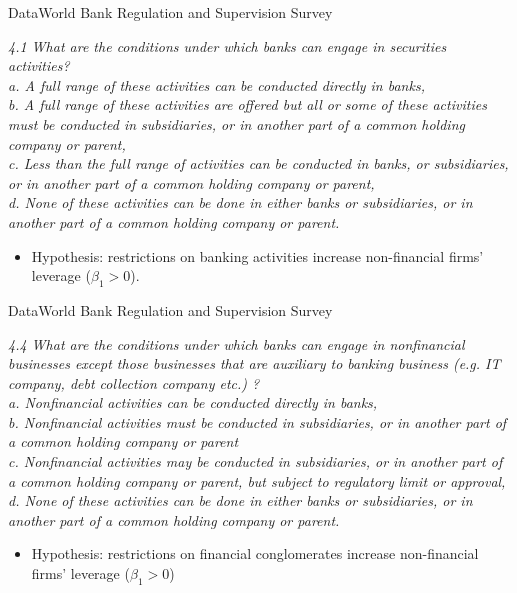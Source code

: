 \documentclass{beamer}
\begin{document}
\begin{frame}{Data}{World Bank Regulation
	and Supervision Survey \citep{barth2013bank}}

	\textit{4.1 What are the conditions under which banks can engage in securities activities?\\
	a. A full range of these activities can be conducted directly in banks,\\
	b. A full range of these activities are offered but all or some of these activities must be conducted in subsidiaries, or in another part of a common holding company or parent,\\
	c. Less than the full range of activities can be conducted in banks, or subsidiaries, or in another part of a common holding company or parent,\\
	d. None of these activities can be done in either banks or subsidiaries, or in another part of a common holding company or parent.}
	\begin{itemize}
	\item Hypothesis: restrictions on banking activities increase non-financial firms' leverage ($\beta_1>0$).
	
\end{itemize}

\end{frame}

\begin{frame}{Data}{World Bank Regulation
	and Supervision Survey \citep{barth2013bank}}

\textit{4.4 What are the conditions under which banks can engage in nonfinancial businesses except those businesses that are auxiliary to banking business (e.g. IT company, debt collection company etc.) ?\\
a. Nonfinancial activities can be conducted directly in banks,\\
b. Nonfinancial activities must be conducted in subsidiaries, or in another part of a common holding company or parent\\
c. Nonfinancial activities may be conducted in subsidiaries, or in another part of a common holding company or parent, but subject to regulatory limit or approval,\\
d. None of these activities can be done in either banks or subsidiaries, or in another part of a common holding company or parent.
}
\begin{itemize}
	\item Hypothesis: restrictions on financial conglomerates increase non-financial firms' leverage ($\beta_1>0$)
	
\end{itemize}

\end{frame}
\end{document}
